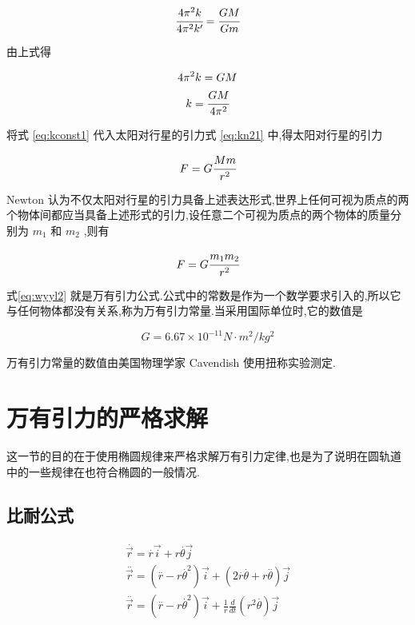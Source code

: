 \begin{equation}
  \cfrac{4\pi^2k}{4\pi^2k'}=\cfrac{GM}{Gm}
  \label{eq:kn25}
\end{equation}

由上式得

\begin{gather}
  4\pi^2k=GM \label{eq:kconst1}\\
  k=\cfrac{GM}{4\pi^2}
  \label{eq:kconst2}
\end{gather}

将式 \eqref{eq:kconst1} 代入太阳对行星的引力式 \eqref{eq:kn21} 中,得太阳对行星的引力

\begin{equation}
  F=G\cfrac{Mm}{r^2}
  \label{eq:wyyl1}
\end{equation}

Newton 认为不仅太阳对行星的引力具备上述表达形式,世界上任何可视为质点的两个物体间都应当具备上述形式的引力,设任意二个可视为质点的两个物体的质量分别为 $m_1$ 和 $m_2$ ,则有

\begin{equation}
  F=G\cfrac{m_1m_2}{r^2}
  \label{eq:wyyl2}
\end{equation}

式\eqref{eq:wyyl2} 就是万有引力公式.公式中的常数是作为一个数学要求引入的,所以它与任何物体都没有关系,称为万有引力常量.当采用国际单位时,它的数值是

\begin{equation}
  G=6.67\times 10^{-11} N\cdot m^2/kg^2
  \label{eq:wyylG}
\end{equation}

万有引力常量的数值由美国物理学家 Cavendish 使用扭称实验测定.

\section{万有引力的严格求解}

这一节的目的在于使用椭圆规律来严格求解万有引力定律,也是为了说明在圆轨道中的一些规律在也符合椭圆的一般情况.

\subsection{比耐公式}

\begin{gather*}
  \overset{.}{\overrightarrow{r}}= \overset{.}{r} \vec{i}+r\overset{.}{\theta}\vec{j} \\
  \overset{..}{\overrightarrow{r}}=(\overset{..}{r}-r\overset{.}{\theta}^2)\vec{i}+(2\overset{.}{r}\overset{.}{\theta}+r\overset{..}{\theta})\vec{j}\\
  \overset{..}{\overrightarrow{r}}=(\overset{..}{r}-r\overset{.}{\theta}^2)\vec{i}+\frac{1}{r}\frac{d}{dt}(r^2\overset{.}{\theta})\vec{j}
\end{gather*}

